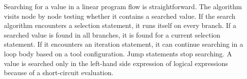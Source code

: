Searching for a value in a linear program flow is straightforward. The algorithm visits node by node testing whether it contains a searched value. If the search algorithm encounters a selection statement, it runs itself on every branch. If a searched value is found in all branches, it is found for a current selection statement. If it encounters an iteration statement, it can continue searching in a loop body based on a tool configuration. Jump statements stop searching. A value is searched only in the left-hand side expression of logical expressions because of a short-circuit evaluation.

\newenvironment{myitemize}
{ \begin{itemize}
	\addtolength{\itemindent}{-15pt}
    \setlength{\itemsep}{1pt}
    \setlength{\parskip}{0pt}
    \setlength{\parsep}{0pt}     }
{ \end{itemize}                  } 

\newenvironment{inneritemize}
{ \begin{itemize}
	\addtolength{\itemindent}{-35pt}
    \setlength{\itemsep}{1pt}
    \setlength{\parskip}{0pt}    }
{ \end{itemize}                  } 

